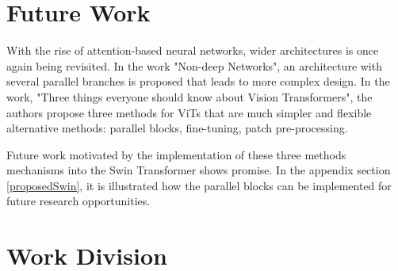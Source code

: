 \documentclass[10pt,twocolumn,letterpaper]{article}
\begin{document}
\section{Future Work}



With the rise of attention-based neural networks, wider architectures is once again being revisited\cite{goyal2021non}. In the work "Non-deep Networks", an architecture with several parallel branches is proposed that leads to more complex design. In the work, "Three things everyone should know about Vision Transformers", the authors propose three methods for ViTs that are much simpler and flexible alternative methods: parallel blocks, fine-tuning, patch pre-processing\cite{touvron2022three}.

Future work motivated by the implementation of these three methods mechanisms into the Swin Transformer shows promise. In the appendix section \ref{proposedSwin}, it is illustrated how the parallel blocks can be implemented for future research opportunities.


\section{Work Division}
\end{document}
